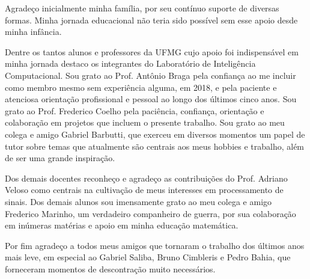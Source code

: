 Agradeço inicialmente minha família, por seu contínuo suporte de diversas
formas. Minha jornada educacional não teria sido possível sem esse apoio desde
minha infância.

Dentre os tantos alunos e professores da UFMG cujo apoio foi indispensável em
minha jornada destaco os integrantes do Laboratório de Inteligência
Computacional. Sou grato ao Prof. Antônio Braga pela confiança ao me incluir
como membro mesmo sem experiência alguma, em 2018, e pela paciente e atenciosa
orientação profissional e pessoal ao longo dos últimos cinco anos. Sou grato ao
Prof. Frederico Coelho pela paciência, confiança, orientação e colaboração em
projetos que incluem o presente trabalho. Sou grato ao meu colega e amigo
Gabriel Barbutti, que exerceu em diversos momentos um papel de tutor sobre
temas que atualmente são centrais aos meus hobbies e trabalho, além de ser
uma grande inspiração.

Dos demais docentes reconheço e agradeço as contribuições do Prof. Adriano
Veloso como centrais na cultivação de meus interesses em processamento de
sinais. Dos demais alunos sou imensamente grato ao meu colega e amigo Frederico
Marinho, um verdadeiro companheiro de guerra, por sua colaboração em inúmeras
matérias e apoio em minha educação matemática.

Por fim agradeço a todos meus amigos que tornaram o trabalho dos últimos anos
mais leve, em especial ao Gabriel Saliba, Bruno Cimbleris e Pedro Bahia, que
forneceram momentos de descontração muito necessários.

\newpage
